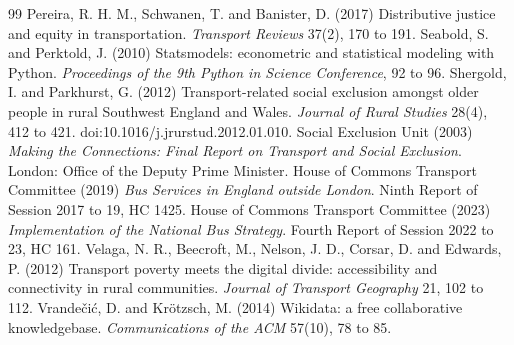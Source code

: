 \documentclass[11pt,a4paper]{article}
\begin{document}
\begin{thebibliography}{99}
 Pereira, R. H. M., Schwanen, T. and Banister, D. (2017) Distributive justice and equity in transportation. \textit{Transport Reviews} 37(2), 170 to 191.
 Seabold, S. and Perktold, J. (2010) Statsmodels: econometric and statistical modeling with Python. \textit{Proceedings of the 9th Python in Science Conference}, 92 to 96.
 Shergold, I. and Parkhurst, G. (2012) Transport-related social exclusion amongst older people in rural Southwest England and Wales. \textit{Journal of Rural Studies} 28(4), 412 to 421. doi:10.1016/j.jrurstud.2012.01.010.
 Social Exclusion Unit (2003) \textit{Making the Connections: Final Report on Transport and Social Exclusion}. London: Office of the Deputy Prime Minister.
 House of Commons Transport Committee (2019) \textit{Bus Services in England outside London}. Ninth Report of Session 2017 to 19, HC 1425.
 House of Commons Transport Committee (2023) \textit{Implementation of the National Bus Strategy}. Fourth Report of Session 2022 to 23, HC 161.
 Velaga, N. R., Beecroft, M., Nelson, J. D., Corsar, D. and Edwards, P. (2012) Transport poverty meets the digital divide: accessibility and connectivity in rural communities. \textit{Journal of Transport Geography} 21, 102 to 112.
 Vrande\v{c}i\'c, D. and Kr\"otzsch, M. (2014) Wikidata: a free collaborative knowledgebase. \textit{Communications of the ACM} 57(10), 78 to 85.
\end{thebibliography}

\appendix
\end{document}
